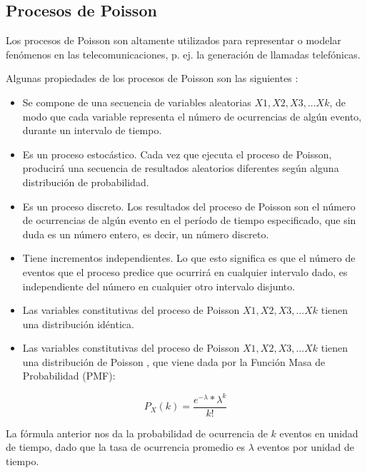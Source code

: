 \subsection{Procesos de Poisson}

Los procesos de Poisson son altamente utilizados para representar o modelar fenómenos en las telecomunicaciones, p. ej. la generación de llamadas telefónicas.\newline

Algunas propiedades de los procesos de Poisson son las siguientes \parencite{ PoissonMedium}:

\begin{itemize}
    \item Se compone de una secuencia de variables aleatorias $X1, X2, X3, ... Xk$, de modo que cada variable representa el número de ocurrencias de algún evento, durante un intervalo de tiempo.
    \item Es un proceso estocástico. Cada vez que ejecuta el proceso de Poisson, producirá una secuencia de resultados aleatorios diferentes según alguna distribución de probabilidad.
    \item Es un proceso discreto. Los resultados del proceso de Poisson son el número de ocurrencias de algún evento en el período de tiempo especificado, que sin duda es un número entero, es decir, un número discreto.
    \item Tiene incrementos independientes. Lo que esto significa es que el número de eventos que el proceso predice que ocurrirá en cualquier intervalo dado, es independiente del número en cualquier otro intervalo disjunto.
    \item Las variables constitutivas del proceso de Poisson $X1, X2, X3, ... Xk$ tienen una distribución idéntica.
    \item Las variables constitutivas del proceso de Poisson $X1, X2, X3, ... Xk$ tienen una distribución de Poisson , que viene dada por la Función Masa de Probabilidad (PMF):
\end{itemize}

\begin{equation}
    P_{X}(k)=\frac{e^{-\lambda}*\lambda ^{k}}{k!}
    \label{eqn:Poisson}
\end{equation}

La fórmula anterior nos da la probabilidad de ocurrencia de $k$ eventos en unidad de tiempo, dado que la tasa de ocurrencia promedio es $\lambda$ eventos por unidad de tiempo.\newline

